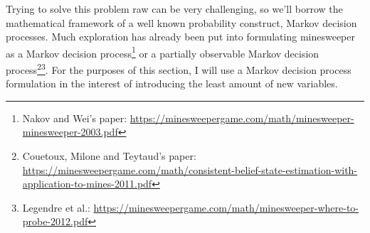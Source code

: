 Trying to solve this problem raw can be very challenging, so we'll borrow the mathematical framework of a well known probability construct, Markov decision processes. Much exploration has already been put into formulating minesweeper as a Markov decision process\footnote{Nakov and Wei's paper: \url{https://minesweepergame.com/math/minesweeper-minesweeper-2003.pdf}} or a partially observable Markov decision process\footnote{Couetoux, Milone and Teytaud's paper:\\ \url{https://minesweepergame.com/math/consistent-belief-state-estimation-with-application-to-mines-2011.pdf}}\footnote{Legendre et al.: \url{https://minesweepergame.com/math/minesweeper-where-to-probe-2012.pdf}}. For the purposes of this section, I will use a Markov decision process formulation in the interest of introducing the least amount of new variables.\\

